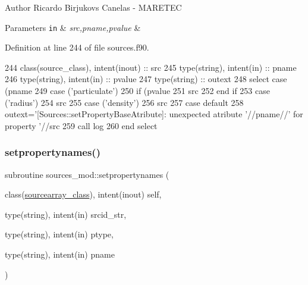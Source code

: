 \begin{DoxyAuthor}{Author}
Ricardo Birjukovs Canelas -\/ M\+A\+R\+E\+T\+EC 
\end{DoxyAuthor}

\begin{DoxyParams}[1]{Parameters}
\mbox{\tt in}  & {\em src,pname,pvalue} & \\
\hline
\end{DoxyParams}


Definition at line 244 of file sources.\+f90.


\begin{DoxyCode}
244     \textcolor{keywordtype}{class}(source\_class), \textcolor{keywordtype}{intent(inout)} :: src
245     \textcolor{keywordtype}{type}(string), \textcolor{keywordtype}{intent(in)} :: pname
246     \textcolor{keywordtype}{type}(string), \textcolor{keywordtype}{intent(in)} :: pvalue
247     \textcolor{keywordtype}{type}(string) :: outext
248     \textcolor{keywordflow}{select case} (pname%
249     \textcolor{keywordflow}{case} (\textcolor{stringliteral}{'particulate'})
250         \textcolor{keywordflow}{if} (pvalue%
251             src%
252 \textcolor{keywordflow}{        end if}
253     \textcolor{keywordflow}{case} (\textcolor{stringliteral}{'radius'})
254         src%
255     \textcolor{keywordflow}{case} (\textcolor{stringliteral}{'density'})
256         src%
257 \textcolor{keywordflow}{        case default}
258         outext=\textcolor{stringliteral}{'[Sources::setPropertyBaseAtribute]: unexpected atribute '}//pname//\textcolor{stringliteral}{' for property '}//src
259         \textcolor{keyword}{call }log%
260 \textcolor{keywordflow}{    end select}
\end{DoxyCode}
\mbox{\label{namespacesources__mod_aa76f16f8ee96bc86b553aa54d420321c}} 
\subsubsection{\texorpdfstring{setpropertynames()}{setpropertynames()}}
{\footnotesize\ttfamily subroutine sources\+\_\+mod\+::setpropertynames (\begin{DoxyParamCaption}\item[{class(\mbox{\hyperlink{structsources__mod_1_1sourcearray__class}{sourcearray\+\_\+class}}), intent(inout)}]{self,  }\item[{type(string), intent(in)}]{srcid\+\_\+str,  }\item[{type(string), intent(in)}]{ptype,  }\item[{type(string), intent(in)}]{pname }\end{DoxyParamCaption})\hspace{0.3cm}{\ttfamily [private]}}



